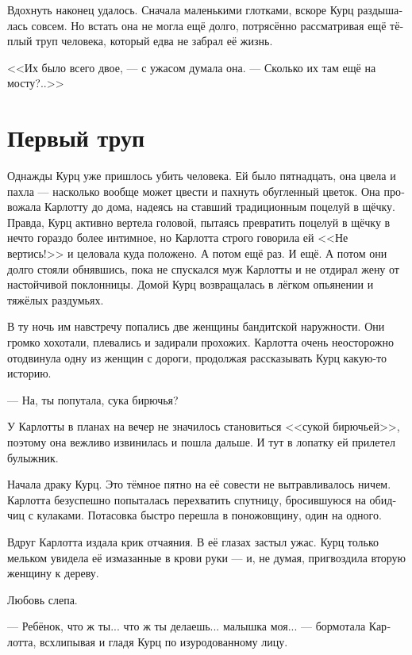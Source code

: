 \documentclass[a4paper,12pt,fleqn]{book}\usepackage{polyglossia}\setdefaultlanguage[babelshorthands=true]{russian}\setotherlanguage{english}\defaultfontfeatures{Ligatures=TeX,Mapping=tex-text}\usepackage{xcolor}\newcommand{\ml}[3]{#2}
\begin{document}
Вдохнуть наконец удалось.
Сначала маленькими глотками, вскоре Курц раздышалась совсем.
Но встать она не могла ещё долго, потрясённо рассматривая ещё тёплый труп человека, который едва не забрал её жизнь.

<<Их было всего двое, --- с ужасом думала она.
--- Сколько их там ещё на мосту?..>>

\section{Первый труп}

Однажды Курц уже пришлось убить человека.
Ей было пятнадцать, она цвела и пахла --- насколько вообще может цвести и пахнуть обугленный цветок.
Она провожала Карлотту до дома, надеясь на ставший традиционным поцелуй в щёчку.
Правда, Курц активно вертела головой, пытаясь превратить поцелуй в щёчку в нечто гораздо более интимное, но Карлотта строго говорила ей <<Не вертись!>> и целовала куда положено.
А потом ещё раз.
И ещё.
А потом они долго стояли обнявшись, пока не спускался муж Карлотты и не отдирал жену от настойчивой поклонницы.
Домой Курц возвращалась в лёгком опьянении и тяжёлых раздумьях.

В ту ночь им навстречу попались две женщины бандитской наружности.
Они громко хохотали, плевались и задирали прохожих.
Карлотта очень неосторожно отодвинула одну из женщин с дороги, продолжая рассказывать Курц какую-то историю.

\ml{$0$}
{--- На, ты попутала, сука бирючья?}
{``Na, lost your way, you wolfbitch?''}

\ml{$0$}
{У Карлотты в планах на вечер не значилось становиться <<сукой бирючьей>>, поэтому она вежливо извинилась и пошла дальше.}
{Karlotta hadn't scheduled being a ``wolfbitch'' for that evening, so she gently apologized and moved on.}
И тут в лопатку ей прилетел булыжник.

Начала драку Курц.
Это тёмное пятно на её совести не вытравливалось ничем.
Карлотта безуспешно попыталась перехватить спутницу, бросившуюся на обидчиц с кулаками.
Потасовка быстро перешла в поножовщину, один на одного.

Вдруг Карлотта издала крик отчаяния.
В её глазах застыл ужас.
Курц только мельком увидела её измазанные в крови руки --- и, не думая, пригвоздила вторую женщину к дереву.

\ml{$0$}
{Любовь слепа.}
{Love is a blind creature.}

--- Ребёнок, что ж ты... что ж ты делаешь... малышка моя... --- бормотала Карлотта, всхлипывая и гладя Курц по изуродованному лицу.
\end{document}

